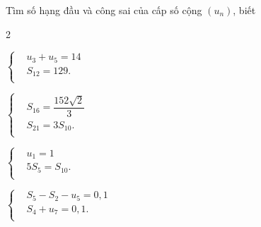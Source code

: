 \begin{bt}%
	Tìm số hạng đầu và công sai của cấp số cộng $(u_n)$, biết
	\begin{enumEX}{2}
		\item $\left\{\begin{aligned} 
			&u_3+u_5=14 \\
			&S_{12}=129. \\
		\end{aligned}\right. $
		\item $\left\{\begin{aligned} 
			&S_{16}=\dfrac{152\sqrt{2}}{3} \\
			&S_{21}=3S_{10}. \\
		\end{aligned}\right. $ 
		\item $\left\{\begin{aligned} 
			&u_1=1 \\
			&5S_5=S_{10}. \\
		\end{aligned}\right. $
		\item $\left\{\begin{aligned} 
			&S_5-S_2-u_5=0{,}1 \\
			&S_4+u_7=0{,}1. \\
		\end{aligned}\right. $
	\end{enumEX}
\end{bt}

